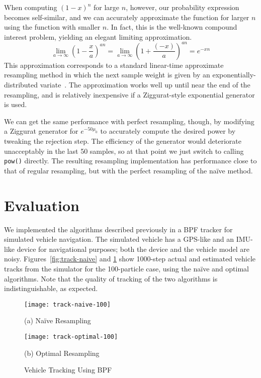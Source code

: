\documentclass{article}
\begin{document}
  When computing $(1 - x)^n$ for large $n$, however, our
  probability expression becomes self-similar, and we can
  accurately approximate the function for larger $n$ using
  the function with smaller $n$.  In fact, this is the
  well-known compound interest problem, yielding an elegant
  limiting approximation.
 $$
\lim_{a \rightarrow \infty}\left(1 - \frac{x}{a}\right)^{an}
  =   \lim_{a \rightarrow \infty}\left(1 + \frac{(-x)}{a}\right)^{an}
  = e^{-xn}$$  This approximation corresponds to a standard 
  linear-time approximate resampling method in which the next sample
  weight is given by an exponentially-distributed
  variate~\cite{carpenter}.  The approximation works well up until near the
  end of the resampling, and is relatively inexpensive if a
  Ziggurat-style exponential generator is used.

  We can get the same performance with perfect resampling,
  though, by modifying a Ziggurat generator for
  $e^{-50\mu_0}$ to accurately compute the desired power by
  tweaking the rejection step.  The efficiency of the
  generator would deteriorate unacceptably in the last 50
  samples, so at that point we just switch to calling {\tt
  pow()} directly.  The resulting resampling implementation
  has performance close to that of regular resampling, but
  with the perfect resampling of the na\"ive method.

\section{Evaluation}

  We implemented the algorithms described previously in a
  BPF tracker for simulated vehicle navigation.  The
  simulated vehicle has a GPS-like and an IMU-like device
  for navigational purposes; both the device and the vehicle
  model are noisy.  Figures~\ref{fig:track-naive} and
  \ref{fig:track-optimal} show 1000-step actual and estimated vehicle
  tracks from the simulator for the 100-particle case, using
  the na\"ive and optimal algorithms.  Note
  that the quality of tracking of the two algorithms is
  indistinguishable, as expected.

  \begin{figure}
    \begin{minipage}{0.45\linewidth}
    \centering
    \texttt{[image: track-naive-100]}
    \begin{center}(a) Na\"ive Resampling\label{fig:track-naive}\end{center}
    \end{minipage}
    \begin{minipage}{0.45\linewidth}
    \centering
    \texttt{[image: track-optimal-100]}
    \begin{center}(b) Optimal Resampling\label{fig:track-optimal}\end{center}
    \end{minipage}
    \caption{Vehicle Tracking Using BPF}
  \end{figure}
\end{document}
